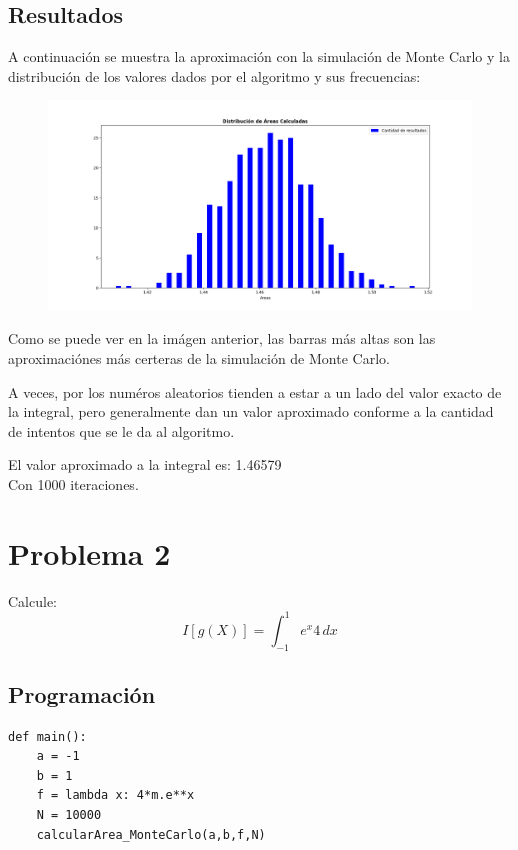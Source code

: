 \documentclass[a4paper,12pt]{article}
\begin{document}
    \subsection{Resultados}
    A continuación se muestra la aproximación con la simulación de Monte Carlo y 
    la distribución de los valores dados por el algoritmo y sus frecuencias:
    \begin{figure}[h]
        \centering
        \includegraphics[width=\textwidth]{ejer1.png}
    \end{figure}

    Como se puede ver en la imágen anterior, las barras más altas son 
    las aproximaciónes más certeras de la simulación de Monte Carlo.

    A veces, por los numéros aleatorios tienden a estar a un lado del valor exacto
    de la integral, pero generalmente dan un valor aproximado conforme a la cantidad de 
    intentos que se le da al algoritmo.

    El valor aproximado a la integral es: 1.46579\\
    Con 1000 iteraciones.
    
    \section{Problema 2}
    Calcule:
    \begin{equation}
        I[g(X)] = \int_{-1}^{1} e^{x}4 \,dx
    \end{equation}
    \subsection{Programación}
\begin{lstlisting}
def main():
    a = -1
    b = 1
    f = lambda x: 4*m.e**x
    N = 10000
    calcularArea_MonteCarlo(a,b,f,N)
\end{lstlisting}
\end{document}
